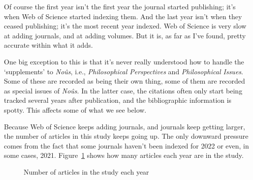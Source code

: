 \documentclass[
  10pt,
  letterpaper,
  DIV=11,
  numbers=noendperiod,
  twoside]{scrartcl}
\begin{document}
Of course the first year isn't the first year the journal started
publishing; it's when Web of Science started indexing them. And the last
year isn't when they ceased publishing; it's the most recent year
indexed. Web of Science is very slow at adding journals, and at adding
volumes. But it is, as far as I've found, pretty accurate within what it
adds.

One big exception to this is that it's never really understood how to
handle the `supplements' to \emph{Noûs}, i.e., \emph{Philosophical
Perspectives} and \emph{Philosophical Issues}. Some of these are
recorded as being their own thing, some of them are recorded as special
issues of \emph{Noûs}. In the latter case, the citations often only
start being tracked several years after publication, and the
bibliographic information is spotty. This affects some of what we see
below.

Because Web of Science keeps adding journals, and journals keep getting
larger, the number of articles in this study keeps going up. The only
downward pressure comes from the fact that some journals haven't been
indexed for 2022 or even, in some cases, 2021.
Figure~\ref{fig-number-of-articles-by-year} shows how many articles each
year are in the study.

\begin{figure}


\caption{\label{fig-number-of-articles-by-year}Number of articles in the
study each year}

\end{figure}%
\end{document}
